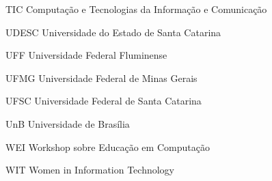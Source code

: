 \begin{siglas}
    \item [TIC] Computação e Tecnologias da Informação e Comunicação
    \item [UDESC] Universidade do Estado de Santa Catarina
    \item [UFF] Universidade Federal Fluminense
    \item [UFMG] Universidade Federal de Minas Gerais
    \item [UFSC] Universidade Federal de Santa Catarina
    \item [UnB] Universidade de Brasília
    \item [WEI] Workshop sobre Educação em Computação
    \item [WIT] Women in Information Technology
  

\end{siglas}



